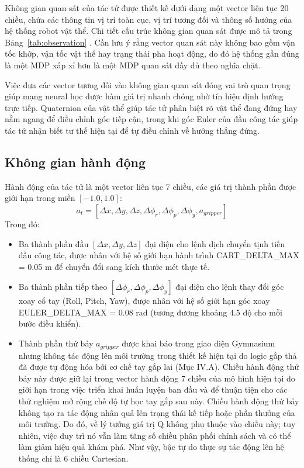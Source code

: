 \documentclass[conference]{IEEEtran}
\begin{document}
Không gian quan sát của tác tử được thiết kế dưới dạng một vector liên tục 20 chiều, chứa các thông tin vị trí toàn cục, vị trí tương đối và thông số hướng của hệ thống robot vật thể. Chi tiết cấu trúc không gian quan sát được mô tả trong Bảng~\ref{tab:observation} \cite{gymnasiumspaces}. Cần lưu ý rằng vector quan sát này không bao gồm vận tốc khớp, vận tốc vật thể hay trạng thái pha hoạt động, do đó hệ thống gần đúng là một MDP xấp xỉ hơn là một MDP quan sát đầy đủ theo nghĩa chặt.

Việc đưa các vector tương đối vào không gian quan sát đóng vai trò quan trọng giúp mạng neural học được hàm giá trị nhanh chóng nhờ tín hiệu định hướng trực tiếp. Quaternion của vật thể giúp tác tử phân biệt rõ vật thể đang đứng hay nằm ngang để điều chỉnh góc tiếp cận, trong khi góc Euler của đầu công tác giúp tác tử nhận biết tư thế hiện tại để tự điều chỉnh về hướng thẳng đứng.

\subsection{Không gian hành động}
Hành động của tác tử là một vector liên tục 7 chiều, các giá trị thành phần được giới hạn trong miền $[-1.0, 1.0]$:
\begin{equation}
a_t = [\Delta x, \Delta y, \Delta z, \Delta \phi_r, \Delta \phi_p, \Delta \phi_y, a_{gripper}]
\end{equation}
Trong đó:
\begin{itemize}
    \item Ba thành phần đầu $[\Delta x, \Delta y, \Delta z]$ đại diện cho lệnh dịch chuyển tịnh tiến đầu công tác, được nhân với hệ số giới hạn hành trình CART\_DELTA\_MAX = 0.05 m để chuyển đổi sang kích thước mét thực tế.
    \item Ba thành phần tiếp theo $[\Delta \phi_r, \Delta \phi_p, \Delta \phi_y]$ đại diện cho lệnh thay đổi góc xoay cổ tay (Roll, Pitch, Yaw), được nhân với hệ số giới hạn góc xoay EULER\_DELTA\_MAX = 0.08 rad (tương đương khoảng 4.5 độ cho mỗi bước điều khiển).
    \item Thành phần thứ bảy $a_{gripper}$ được khai báo trong giao diện Gymnasium nhưng không tác động lên môi trường trong thiết kế hiện tại do logic gắp thả đã được tự động hóa bởi cơ chế tay gắp lai (Mục IV.A). Chiều hành động thứ bảy này được giữ lại trong vector hành động 7 chiều của mô hình hiện tại do giới hạn trong việc triển khai huấn luyện ban đầu và để thuận tiện cho các thử nghiệm mở rộng chế độ tự học tay gắp sau này. Chiều hành động thứ bảy không tạo ra tác động nhân quả lên trạng thái kế tiếp hoặc phần thưởng của môi trường. Do đó, về lý tưởng giá trị Q không phụ thuộc vào chiều này; tuy nhiên, việc duy trì nó vẫn làm tăng số chiều phân phối chính sách và có thể làm giảm hiệu quả khám phá. Như vậy, bậc tự do thực sự tác động lên hệ thống chỉ là 6 chiều Cartesian.
\end{itemize}
\end{document}
